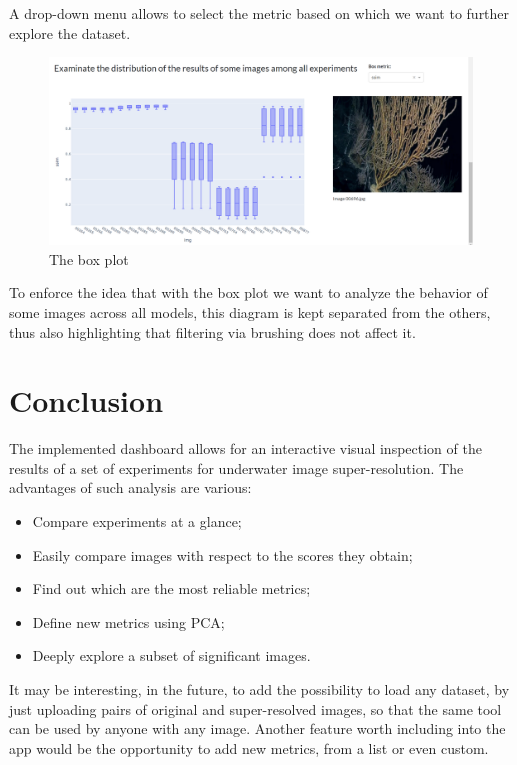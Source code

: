 \documentclass[12pt]{article}
\begin{document}
	A drop-down menu allows to select the metric based on which we want to further explore the dataset.

	\begin{figure}[h!]
		\centering
		\includegraphics[width=0.7\linewidth]{imgs/box}
		\caption{The box plot}
		\label{fig:box}
	\end{figure}

	To enforce the idea that with the box plot we want to analyze the behavior of some images across all models, this diagram is kept separated from the others, thus also highlighting that filtering via brushing does not affect it.


	\section{Conclusion}\label{sec:conclusion}

	The implemented dashboard allows for an interactive visual inspection of the results of a set of experiments for underwater image super-resolution. The advantages of such analysis are various:
	\begin{itemize}
		\item Compare experiments at a glance;
		\item Easily compare images with respect to the scores they obtain;
		\item Find out which are the most reliable metrics;
		\item Define new metrics using PCA;
		\item Deeply explore a subset of significant images.
	\end{itemize}
	It may be interesting, in the future, to add the possibility to load any dataset, by just uploading pairs of original and super-resolved images, so that the same tool can be used by anyone with any image.
	Another feature worth including into the app would be the opportunity to add new metrics, from a list or even custom.


	\newpage
	\printbibliography
\end{document}
